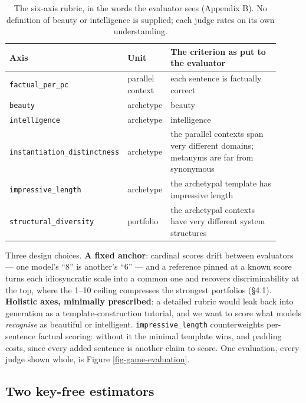 \documentclass{article}
\begin{document}
\begin{table}[htb]
\caption{The six-axis rubric, in the words the evaluator sees (Appendix B). No definition of beauty or intelligence is supplied; each judge rates on its own understanding.}
\label{tab-rubric}
\begin{center}\footnotesize
\begin{tabular}{>{\raggedright\arraybackslash}p{0.28\linewidth}>{\raggedright\arraybackslash}p{0.10\linewidth}>{\raggedright\arraybackslash}p{0.53\linewidth}}
\toprule\noalign{}
Axis & Unit & The criterion as put to the evaluator \\
\midrule\noalign{}
\texttt{factual\_\allowbreak{}per\_\allowbreak{}pc} & parallel context & each sentence is factually correct \\
\texttt{beauty} & archetype & beauty \\
\texttt{intelligence} & archetype & intelligence \\
\texttt{instantiation\_\allowbreak{}distinctness} & archetype & the parallel contexts span very different domains; metanyms are far from synonymous \\
\texttt{impressive\_\allowbreak{}length} & archetype & the archetypal template has impressive length \\
\texttt{structural\_\allowbreak{}diversity} & portfolio & the archetypal contexts have very different system structures \\
\bottomrule
\end{tabular}
\end{center}
\end{table}

Three design choices. \textbf{A fixed anchor}: cardinal scores drift between evaluators --- one model's ``8'' is another's ``6'' --- and a reference pinned at a known score turns each idiosyncratic scale into a common one and recovers discriminability at the top, where the 1--10 ceiling compresses the strongest portfolios (\S{}4.1). \textbf{Holistic axes, minimally prescribed}: a detailed rubric would leak back into generation as a template-construction tutorial, and we want to score what models \emph{recognise} as beautiful or intelligent. \texttt{impressive\_\allowbreak{}length} counterweights per-sentence factual scoring: without it the minimal template wins, and padding costs, since every added sentence is another claim to score. One evaluation, every judge shown whole, is Figure \ref{fig-game-evaluation}.

\subsection{Two key-free estimators}\label{two-key-free-estimators}
\end{document}
